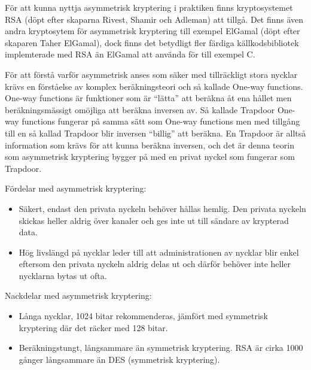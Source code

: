 \documentclass[11pt]{article}
\begin{document}
För att kunna nyttja asymmetrisk kryptering i praktiken finns kryptosystemet RSA (döpt efter skaparna Rivest, Shamir och Adleman) att tillgå. Det finns även andra kryptosytem för asymmetrisk kryptering till exempel ElGamal (döpt efter skaparen Taher ElGamal), dock finns det betydligt fler färdiga källkodsbibliotek implemterade med RSA än ElGamal att använda för till exempel C. 

För att förstå varför asymmetrisk anses som säker med tillräckligt stora nycklar krävs en förståelse av komplex beräkningsteori och så kallade One-way functions. One-way functions är funktioner som är “lätta” att beräkna åt ena hållet men beräkningsmässigt omöjliga att beräkna inversen av. Så kallade Trapdoor One-way functions fungerar på samma sätt som One-way functions men med tillgång till en så kallad Trapdoor blir inversen “billig” att beräkna. En Trapdoor är alltså information som krävs för att kunna beräkna inversen, och det är denna teorin som asymmetrisk kryptering bygger på med en privat nyckel som fungerar som Trapdoor.

Fördelar med asymmetrisk kryptering:
\begin{itemize}
\item Säkert, endast den privata nyckeln behöver hållas hemlig. Den privata nyckeln skickas heller aldrig över kanaler och ges inte ut till sändare av krypterad data. 
\item Hög livslängd på nycklar leder till att administrationen av nycklar blir enkel eftersom den privata nyckeln aldrig delas ut och därför behöver inte heller nycklarna bytas ut ofta. 
\end{itemize}

Nackdelar med asymmetrisk kryptering:
\begin{itemize}
\item Långa nycklar, 1024 bitar rekommenderas, jämfört med symmetrisk kryptering där det räcker med 128 bitar.
\item Beräkningstungt, långsammare än symmetrisk kryptering. RSA är cirka 1000 gånger långsammare än DES (symmetrisk kryptering).
\end{itemize}
\end{document}
